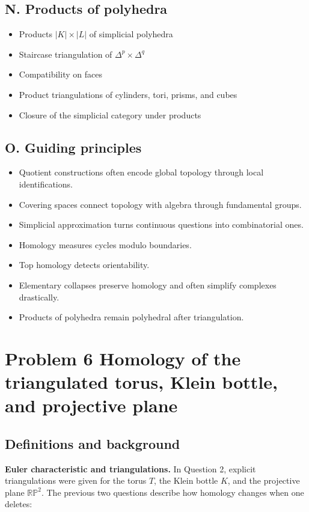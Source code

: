 \documentclass[12pt,a4paper]{article}
\theoremstyle{notespace}
\begin{document}
	\subsection*{N. Products of polyhedra}
	\begin{itemize}
		\item Products \(|K|\times |L|\) of simplicial polyhedra
		\item Staircase triangulation of \(\Delta^p\times \Delta^q\)
		\item Compatibility on faces
		\item Product triangulations of cylinders, tori, prisms, and cubes
		\item Closure of the simplicial category under products
	\end{itemize}
	
	\subsection*{O. Guiding principles}
	\begin{itemize}
		\item Quotient constructions often encode global topology through local identifications.
		\item Covering spaces connect topology with algebra through fundamental groups.
		\item Simplicial approximation turns continuous questions into combinatorial ones.
		\item Homology measures cycles modulo boundaries.
		\item Top homology detects orientability.
		\item Elementary collapses preserve homology and often simplify complexes drastically.
		\item Products of polyhedra remain polyhedral after triangulation.
	\end{itemize}

\section{Problem 6 Homology of the triangulated torus, Klein bottle, and projective plane}

\subsection{Definitions and background}

\textbf{Euler characteristic and triangulations.}
In Question 2, explicit triangulations were given for the torus \(T\), the Klein bottle \(K\), and the projective plane \(\mathbb{RP}^2\). The previous two questions describe how homology changes when one deletes:
\end{document}
